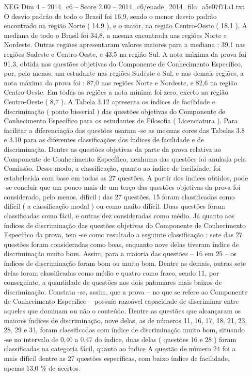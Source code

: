 \begin{textsample}{NEG Dim 4 – 2014\_c6 – Score 2.00 – 2014\_c6/enade\_2014\_filo\_a5e07f71a1.txt}
O desvio padrão de todo o Brasil foi 16,9, sendo o menor desvio padrão encontrado na região Norte ( 14,9 ), e o maior, na região Centro-Oeste ( 18,1 ).
A mediana de todo o Brasil foi 34,8, a mesma encontrada nas regiões Norte e Nordeste.
Outras regiões apresentaram valores maiores para a mediana : 39,1 nas regiões Sudeste e Centro-Oeste, e 43,5 na região Sul.
A nota máxima da prova foi 91,3, obtida nas questões objetivas do Componente de Conhecimento Específico, por, pelo menos, um estudante nas regiões Sudeste e Sul, e nas demais regiões, a nota máxima da prova foi : 87,0 nas regiões Norte e Nordeste, e 82,6 na região Centro-Oeste.
Em todas as regiões a nota mínima foi zero, exceto na região Centro-Oeste ( 8,7 ).
A Tabela 3.12 apresenta os índices de facilidade e discriminação ( ponto bisserial ) das questões objetivas do Componente de Conhecimento Específico para os estudantes de Filosofia ( Licenciatura ).
Para facilitar a diferenciação das questões usaram -se as mesmas cores das Tabelas 3.8 e 3.10 para as diferentes classificações dos índices de facilidade e de discriminação.
Dentre as questões objetivas da parte da prova relativa ao Componente de Conhecimento Específico, nenhuma das questões foi anulada pela Comissão.
Desse modo, a classificação, quanto ao índice de facilidade, foi estabelecida com base em todas as 27 questões.
A partir dos índices obtidos, pode -se concluir que um pouco mais de um terço das questões objetivas da prova foi considerado, pelo menos, difícil : das 27 questões, 15 foram classificadas como difícil ( a classificação modal ) ou como muito difícil.
Duas questões foram classificadas como fácil, e outras dez consideradas como médio.
Já quanto aos índices de discriminação das questões objetivas do Componente de Conhecimento Específico da prova, tem -se como resultado a seguinte classificação : sete das 27 questões foram consideradas como boas, enquanto nove delas tiveram índice de discriminação muito bom.
Assim, para a maioria das questões – 16 em 25 – os índices de discriminação foram bom ou muito bom.
Dentre as demais, outras sete delas foram classificadas como médio e quatro como fraco, sendo 11, por conseguinte, a quantidade de questões nos dois patamares mais baixos de discriminação.
Constata -se, assim, que a prova – no que se refere ao Componente de Conhecimento Específico – possuía razoável capacidade de discriminar entre aqueles que dominam ou não o conteúdo.
Dentre as questões que alcançaram os maiores índices de discriminação, nove delas, as de números 11, 16, 17, 18, 21, 23, 28, 29 e 31, foram classificadas com índice de discriminação muito bom, situando -se no intervalo de 0,40 a 0,47 do índice, duas delas ( questões 16 e 28 ) foram classificadas na categoria fácil, quanto ao índice A questão de número 24 foi a mais difícil dentre as 27 questões específicas, com baixo índice de facilidade, apenas 13,0 \% de acertos.

\end{textsample}
